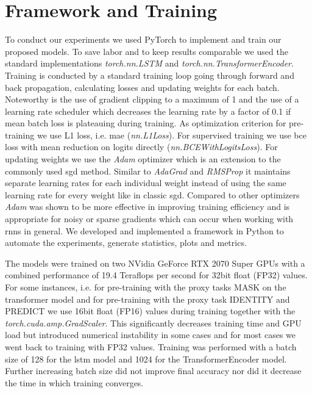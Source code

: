 
\section{Framework and Training} \label{sec:methodology:freamework_and_training}

To conduct our experiments we used PyTorch \cite{pytorch} to implement and train our proposed models. To save labor and to keep results comparable we used the standard implementations \textit{torch.nn.LSTM} and \textit{torch.nn.TransformerEncoder}. Training is conducted by a standard training loop going through forward and back propagation, calculating losses and updating weights for each batch. Noteworthy is the use of gradient clipping to a maximum of 1 and the use of a learning rate scheduler which decreases the learning rate by a factor of 0.1 if mean batch loss is plateauing during training. As optimization criterion for pre-training we use L1 loss, i.e. \gls{mae} (\textit{nn.L1Loss}). For supervised training we use \gls{bce} loss with mean reduction on logits directly (\textit{nn.BCEWithLogitsLoss}).
For updating weights we use the \textit{Adam} optimizer \cite{adam} which is an extension to the commonly used \gls{sgd} method. Similar to \textit{AdaGrad} \cite{optimizer_comparison} and \textit{RMSProp} \cite{optimizer_comparison} it maintains separate learning rates for each individual weight instead of using the same learning rate for every weight like in classic \gls{sgd}. Compared to other optimizers \textit{Adam} was shown to be more effective in improving training efficiency \cite{adam} and is appropriate for noisy or sparse gradients which can occur when working with \glspl{rnn} in general.
We developed and implemented a framework in Python to automate the experiments, generate statistics, plots and metrics. \par
The models were trained on two NVidia GeForce RTX 2070 Super GPUs with a combined performance of 19.4 Teraflops per second for 32bit float (FP32) values. For some instances, i.e. for pre-training with the proxy tasks MASK on the transformer model and for pre-training with the proxy task IDENTITY and PREDICT we use 16bit float (FP16) values during training together with the \textit{torch.cuda.amp.GradScaler}. This significantly decreases training time and GPU load but introduced numerical instability in some cases and for most cases we went back to training with FP32 values. Training was performed with a batch size of 128 for the \gls{lstm} model and 1024 for the TransformerEncoder model. Further increasing batch size did not improve final accuracy nor did it decrease the time in which training converges. \par

